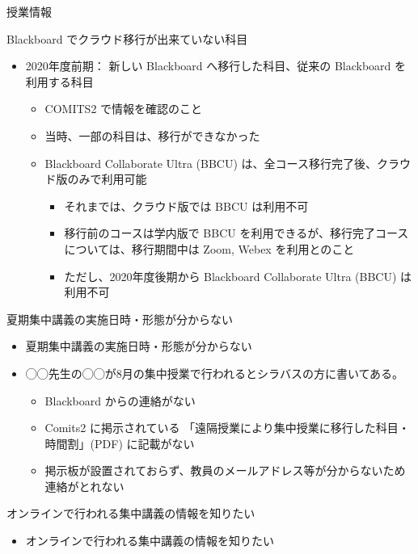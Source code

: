 \documentclass[a4j,10pt]{jsarticle}
\begin{document}
{\newpage\clearpage
{}%
\begin{frame}[label={sec:orgf983361},fragile]{授業情報}
\begin{block}{Blackboard でクラウド移行が出来ていない科目}
\begin{itemize}
\item 2020年度前期： 新しい Blackboard へ移行した科目、従来の Blackboard を利用する科目
\begin{itemize}
\item COMITS2 で情報を確認のこと
\item 当時、一部の科目は、移行ができなかった
\item Blackboard Collaborate Ultra (BBCU) は、全コース移行完了後、クラウド版のみで利用可能
\begin{itemize}
\item それまでは、クラウド版では BBCU は利用不可
\item 移行前のコースは学内版で BBCU を利用できるが、移行完了コースについては、移行期間中は Zoom, Webex を利用とのこと
\item ただし、2020年度後期から Blackboard Collaborate Ultra (BBCU) は利用不可
\end{itemize}
\end{itemize}
\end{itemize}
\end{block}
\par
\begin{block}{夏期集中講義の実施日時・形態が分からない}
\begin{itemize}
\item 夏期集中講義の実施日時・形態が分からない
\item ◯◯先生の◯◯が8月の集中授業で行われるとシラバスの方に書いてある。
\begin{itemize}
\item Blackboard からの連絡がない
\item Comits2 に掲示されている 「遠隔授業により集中授業に移行した科目・時間割」(PDF) に記載がない
\item 掲示板が設置されておらず、教員のメールアドレス等が分からないため連絡がとれない
\end{itemize}
\end{itemize}
\end{block}
\par
\begin{block}{オンラインで行われる集中講義の情報を知りたい}
\begin{itemize}
\item オンラインで行われる集中講義の情報を知りたい

\end{itemize}
\end{block}
\end{frame}}
\end{document}
